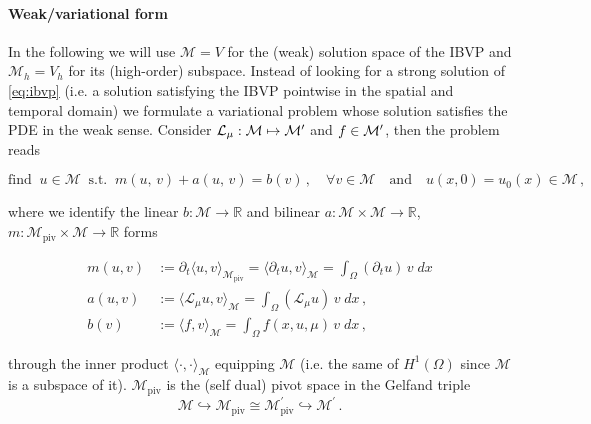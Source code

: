 \documentclass[../main.tex]{subfiles}
\begin{document}
\paragraph{Weak/variational form}\label{par:weak_form}

In the following we will use $\mathcal{M}=V$ for the (weak) solution space of the IBVP and $\mathcal{M}_{h}=V_{h}$ for its (high-order) subspace.
Instead of looking for a strong solution of \eqref{eq:ibvp} (i.e. a solution satisfying the IBVP pointwise in the spatial and temporal domain) we formulate a variational problem whose solution satisfies the PDE in the weak sense.
Consider $\mathcal{L}_{\mu}: \mathcal{M}\mapsto \mathcal{M}'$ and $f\in \mathcal{M}'$, then the problem reads

\begin{equation}\label{eq:variational_problem}
     \text{find}\;\;u\in\mathcal{M}\;\;\text{s.t.}\;\;m(u,\,v) + a(u,\,v) = b(v)\,,\quad\forall v\in \mathcal{M}\quad\text{and}\quad u(x,0)=u_{0}(x)\in\mathcal{M}\,,
\end{equation}

where we identify the linear $b:\mathcal{M}\to\mathbb{R}$ and bilinear $a:\mathcal{M}\times \mathcal{M}\to \mathbb{R}$, $m:\mathcal{M}_{\text{piv}}\times \mathcal{M}\to \mathbb{R}$ forms 

\begin{align*}
      m(u,v) &:= \partial_{t}\langle u,v\rangle_{\mathcal{M}_{\text{piv}}} = \langle  \partial_{t}u,v\rangle_{\mathcal{M}} = \int_{\Omega}^{}(\partial_{t}u)\,v\;dx \\
      a(u,v) &:= \langle \mathcal{L}_{\mu}u,v\rangle_{\mathcal{M}} = \int_{\Omega}^{}(\mathcal{L}_{\mu}u)\,v\;dx \,, \\ 
      b(v) &:= \langle f,v\rangle_{\mathcal{M}} = \int_{\Omega}^{}f(x,u,\mu)\,v\;dx\,,
\end{align*}

through the inner product $\langle\cdot,\cdot\rangle_{\mathcal{M}}$ equipping $\mathcal{M}$ (i.e. the same of $H^{1}(\Omega)$ since $\mathcal{M}$ is a subspace of it).
$\mathcal{M}_{\text{piv}}$ is the (self dual) pivot space in the Gelfand triple
\begin{equation*}
     \mathcal{M}\hookrightarrow\mathcal{M}_{\text{piv}}\cong\mathcal{M}_{\text{piv}}^{'}\hookrightarrow \mathcal{M}^{'}\,.
\end{equation*}
\end{document}
